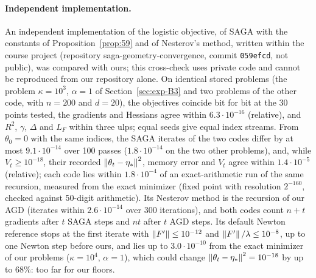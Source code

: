 \paragraph{Independent implementation.}
An independent implementation of the logistic objective, of SAGA with the constants of Proposition~\ref{prop:59} and of
Nesterov's method, written within the course project (repository saga-geometry-convergence, commit \texttt{059efcd}, not
public), was compared with ours; this cross-check uses private code and cannot be reproduced from our repository alone.
On identical stored problems (the problem $\kappa=10^3$, $\alpha=1$ of Section~\ref{sec:exp-B3} and two problems
of the other code, with $n=200$ and $d=20$), the objectives coincide bit for bit at the 30 points tested, the gradients
and Hessians agree within $6.3\cdot10^{-16}$ (relative), and $R^2$, $\gamma$, $\Delta$ and $L_F$ within three ulps;
equal seeds give equal index streams. From $\theta_0=0$ with the same indices, the SAGA iterates of the two codes differ
by at most $9.1\cdot10^{-14}$ over 100 passes ($1.8\cdot10^{-14}$ on the two other problems), and, while
$V_t\ge10^{-18}$, their recorded $\left\|\theta_t-\eta_\ast\right\|^2$, memory error and $V_t$ agree within $1.4\cdot10^{-5}$
(relative); each code lies within $1.8\cdot10^{-4}$ of an exact-arithmetic run of the same recursion, measured from the
exact minimizer (fixed point with resolution $2^{-160}$, checked against 50-digit arithmetic). Its Nesterov method is the
recursion of our AGD (iterates within $2.6\cdot10^{-14}$ over 300 iterations), and both codes count $n+t$ gradients
after $t$ SAGA steps and $nt$ after $t$ AGD steps. Its default Newton reference stops at the first iterate with
$\left\|F'\right\|\le10^{-12}$ and $\left\|F'\right\|/\lambda\le10^{-8}$, up to one Newton step before ours, and lies up to
$3.0\cdot10^{-10}$ from the exact minimizer of our problems ($\kappa=10^4$, $\alpha=1$), which could change
$\left\|\theta_t-\eta_\ast\right\|^2=10^{-18}$ by up to $68\%$: too far for our floors.

